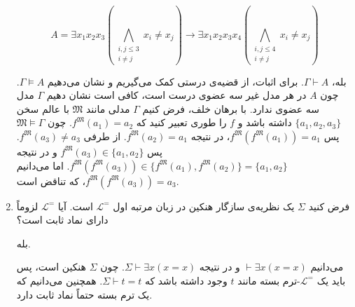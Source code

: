 \documentclass[12pt, 14paper]{article}
\begin{document}
\begin{enumerate}
\begin{ans}
    $$A = \exists x_1 x_2 x_3 (\bigwedge_{\substack{i,j \leq 3 \\ i \neq j}} x_i \neq x_j) \rightarrow \exists x_1 x_2 x_3 x_4 (\bigwedge_{\substack{i,j \leq 4 \\ i \neq j}} x_i \neq x_j)$$

    بله، $\Gamma \vdash A$. برای اثبات، از قضیه‌ی درستی کمک می‌گیریم و نشان می‌دهیم $\Gamma \vDash A$. چون $A$ در هر مدل غیر سه عضوی درست است، کافی است نشان دهیم $\Gamma$ مدل سه عضوی ندارد. با برهان خلف، فرض کنیم $\Gamma$ مدلی مانند $\mathfrak{M}$ با عالم سخن $\{ a_1, a_2, a_3 \}$ داشته باشد و $f$ را طوری تعبیر کنید که $f^\mathfrak{M}(a_1) = a_2$. چون $\mathfrak{M} \vDash \Gamma$ پس $f^\mathfrak{M}(f^\mathfrak{M}(a_1)) = a_1$، در نتیجه $f^\mathfrak{M}(a_2) = a_1$. از طرفی $f^\mathfrak{M}(a_3) \neq a_3$. پس $f^\mathfrak{M}(a_3) \in \{ a_1, a_2 \}$ و در نتیجه $f^\mathfrak{M}(f^\mathfrak{M}(a_3)) \in \{ f^\mathfrak{M}(a_1), f^\mathfrak{M}(a_2) \} = \{ a_1, a_2 \}$. اما می‌دانیم $f^\mathfrak{M}(f^\mathfrak{M}(a_3)) = a_3$، که تناقض است.
\end{ans}

\item فرض کنید $\Sigma$ یک نظریه‌ی سازگار هنکین در زبان مرتبه اول $\mathcal{L}^=$ است. آیا $\mathcal{L}^=$ لزوماً دارای نماد ثابت است؟
\begin{ans}
  بله.
  
  می‌دانیم $\vdash \exists x (x = x)$ و در نتیجه $\Sigma \vdash \exists x (x = x)$. چون $\Sigma$ هنکین است، پس باید یک $\mathcal{L}^=$-ترم بسته مانند $t$ وجود داشته باشد که $\Sigma \vdash t = t$. همچنین می‌دانیم که یک ترم بسته حتماً نماد ثابت دارد.
\end{ans}


\end{enumerate}
\end{document}
